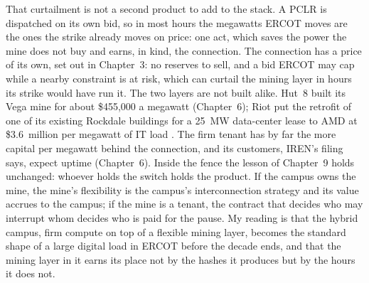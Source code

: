That curtailment is not a second product to add to the stack. A PCLR is dispatched on its own bid, so in most hours the megawatts ERCOT moves are the ones the strike already moves on price: one act, which saves the power the mine does not buy and earns, in kind, the connection. The connection has a price of its own, set out in Chapter~3: no reserves to sell, and a bid ERCOT may cap while a nearby constraint is at risk, which can curtail the mining layer in hours its strike would have run it. %
The two layers are not built alike. Hut~8 built its Vega mine for about \$455,000 a megawatt (Chapter~6); Riot put the retrofit of one of its existing Rockdale buildings for a 25~MW data-center lease to AMD at \$3.6~million per megawatt of IT load \autocite{riot2026amd}. The firm tenant has by far the more capital per megawatt behind the connection, and its customers, IREN's filing says, expect uptime (Chapter~6). %
Inside the fence the lesson of Chapter~9 holds unchanged: whoever holds the switch holds the product. If the campus owns the mine, the mine's flexibility is the campus's interconnection strategy and its value accrues to the campus; if the mine is a tenant, the contract that decides who may interrupt whom decides who is paid for the pause. My reading is that the hybrid campus, firm compute on top of a flexible mining layer, becomes the standard shape of a large digital load in ERCOT before the decade ends, and that the mining layer in it earns its place not by the hashes it produces but by the hours it does not.

